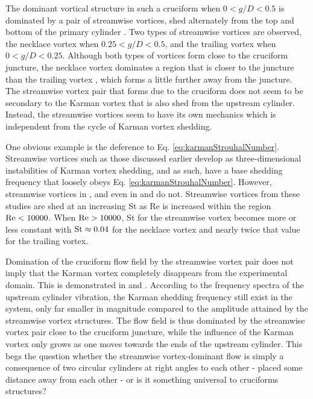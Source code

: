 \documentclass[oneside]{utmthesis}
\begin{document}
The dominant vortical structure in such a cruciform when $0 < g/D < 0.5$ is dominated by a pair of streamwise vortices, shed alternately from the top and bottom of the primary cylinder \citep{Koide2017}. Two types of streamwise vortices are observed, the necklace vortex when $0.25 < g/D < 0.5$, and the trailing vortex when $0 < g/D < 0.25$. Although both types of vortices form close to the cruciform juncture, the necklace vortex dominates a region that is closer to the juncture than the trailing vortex \citep{Takahashi1999}, which forms a little further away from the juncture. The streamwise vortex pair that forms due to the cruciform does not seem to be secondary to the Karman vortex that is also shed from the upstream cylinder. Instead, the streamwise vortices seem to have its own mechanics which is independent from the cycle of Karman vortex shedding.

One obvious example is the deference to Eq. \ref{eq:karmanStrouhalNumber}. Streamwise vortices such as those discussed earlier \citep{Zhang2016,Rai2018,Agbaglah2019,Zhang2019} develop as three-dimensional instabilities of Karman vortex shedding, and as such, have a base shedding frequency that loosely obeys Eq. \ref{eq:karmanStrouhalNumber}. However, streamwise vortices in \citet{Takahashi1999}, and even in \citet{Shirakashi2001} and \citet{Bae2001} do not. Streamwise vortices from these studies are shed at an increasing St as Re is increased within the region $\text{Re} < 10000$. When $\text{Re} > 10000$, St for the streamwise vortex becomes more or less constant with $\text{St} \approx 0.04$ for the necklace vortex and nearly twice that value for the trailing vortex.

Domination of the cruciform flow field by the streamwise vortex pair does not imply that the Karman vortex completely disappears from the experimental domain. This is demonstrated in \citet{Koide2006} and \citet{Kato2006}. According to the frequency spectra of the upstream cylinder vibration, the Karman shedding frequency still exist in the system, only far smaller in magnitude compared to the amplitude attained by the streamwise vortex structures. The flow field is thus dominated by the streamwise vortex pair close to the cruciform juncture, while the influence of the Karman vortex only grows as one moves towards the ends of the upstream cylinder. This begs the question whether the streamwise vortex-dominant flow is simply a consequence of two circular cylinders at right angles to each other - placed some distance away from each other - or is it something universal to cruciforms structures?
\end{document}
